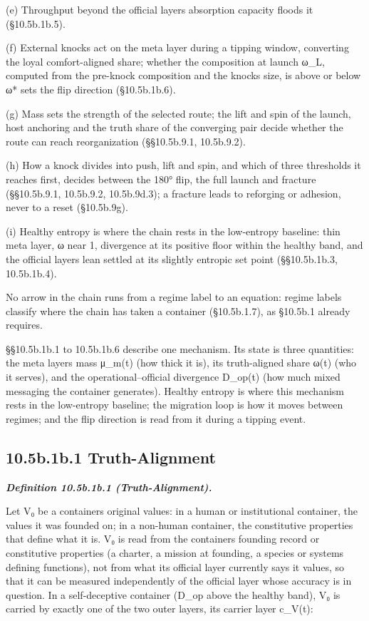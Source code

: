 \documentclass[
]{article}
\begin{document}
(e) Throughput beyond the official layer\textquotesingle s absorption
capacity floods it (§10.5b.1b.5).

(f) External knocks act on the meta layer during a tipping window,
converting the loyal comfort-aligned share; whether the composition at
launch ω\_L, computed from the pre-knock composition and the
knock\textquotesingle s size, is above or below ω* sets the flip
direction (§10.5b.1b.6).

(g) Mass sets the strength of the selected route; the lift and spin of
the launch, host anchoring and the truth share of the converging pair
decide whether the route can reach reorganization (§§10.5b.9.1,
10.5b.9.2).

(h) How a knock divides into push, lift and spin, and which of three
thresholds it reaches first, decides between the 180° flip, the full
launch and fracture (§§10.5b.9.1, 10.5b.9.2, 10.5b.9d.3); a fracture
leads to reforging or adhesion, never to a reset (§10.5b.9g).

(i) Healthy entropy is where the chain rests in the low-entropy
baseline: thin meta layer, ω near 1, divergence at its positive floor
within the healthy band, and the official layer\textquotesingle s lean
settled at its slightly entropic set point (§§10.5b.1b.3, 10.5b.1b.4).

No arrow in the chain runs from a regime label to an equation: regime
labels classify where the chain has taken a container (§10.5b.1.7), as
§10.5b.1 already requires.

§§10.5b.1b.1 to 10.5b.1b.6 describe one mechanism. Its state is three
quantities: the meta layer\textquotesingle s mass μ\_m(t) (how thick it
is), its truth-aligned share ω(t) (who it serves), and the
operational--official divergence D\_op(t) (how much mixed messaging the
container generates). Healthy entropy is where this mechanism rests in
the low-entropy baseline; the migration loop is how it moves between
regimes; and the flip direction is read from it during a tipping event.

\hypertarget{b.1b.1-truth-alignment}{%
\subsection{10.5b.1b.1 Truth-Alignment}\label{b.1b.1-truth-alignment}}

\emph{\textbf{Definition 10.5b.1b.1 (Truth-Alignment).}}

Let V₀ be a container\textquotesingle s original values: in a human or
institutional container, the values it was founded on; in a non-human
container, the constitutive properties that define what it is. V₀ is
read from the container\textquotesingle s founding record or
constitutive properties (a charter, a mission at founding, a
species\textquotesingle{} or system\textquotesingle s defining
functions), not from what its official layer currently says it values,
so that it can be measured independently of the official layer whose
accuracy is in question. In a self-deceptive container (D\_op above the
healthy band), V₀ is carried by exactly one of the two outer layers, its
carrier layer c\_V(t):
\end{document}
